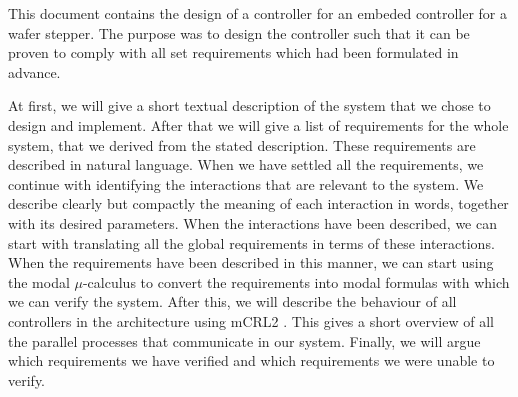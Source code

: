 \cbstart This document contains the design of a controller for an embeded controller for a wafer stepper. The purpose was to design the controller such that it can be proven to comply with all set requirements which had been formulated in advance. \cbend

At first, we will give a short textual description of the system that we chose to design and implement. After that we will give a list of requirements for the whole system, that we derived from the stated description. These requirements are described in natural language. When we have settled all the requirements, we continue with identifying the interactions that are relevant to the system. We describe clearly but compactly the meaning of each interaction in words, together with its desired parameters. When the interactions have been described, we can start with translating all the global requirements in terms of these interactions. When the requirements have been described in this manner, we can start using the modal $\mu$-calculus to convert the requirements into modal formulas with which we can verify the system. After this, we will describe the behaviour of all controllers in the architecture using mCRL2 \cite{url:mcrl}. This gives a short overview of all the parallel processes that communicate in our system. Finally, we will argue which requirements we have verified and which requirements we were unable to verify.

